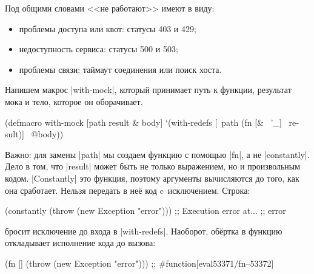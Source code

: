 Под общими словами <<не работают>> имеют в виду:


\begin{itemize}

\item
  проблемы доступа или квот: статусы 403 и 429;

\item
  недоступность сервиса: статусы 500 и 503;

\item
  проблемы связи: таймаут соединения или поиск хоста.

\end{itemize}

Напишем макрос \spverb|with-mock|, который принимает путь к функции, результат
мока и тело, которое он оборачивает.


\begin{english}
  \begin{clojure}
(defmacro with-mock
  [path result & body]
  `(with-redefs
     [~path (fn [& ~'_] ~result)]
     ~@body))
  \end{clojure}
\end{english}

Важно: для замены \spverb|path| мы создаем функцию с помощью \spverb|fn|, а не
\spverb|constantly|. Дело в том, что \spverb|result| может быть не только
выражением, но и произвольным кодом. \spverb|Constantly| это функция, поэтому
аргументы вычисляются до того, как она сработает. Нельзя передать в неё код
c~исключением. Строка:

\begin{english}
  \begin{clojure}
(constantly (throw (new Exception "error")))
;; Execution error at...
;; error
  \end{clojure}
\end{english}


\noindent
бросит исключение до входа в \spverb|with-redefs|. Наоборот, обёртка в
функцию откладывает исполнение кода до вызова:

\begin{english}
  \begin{clojure}
(fn [] (throw (new Exception "error")))
;; #function[eval53371/fn--53372]
  \end{clojure}
\end{english}

